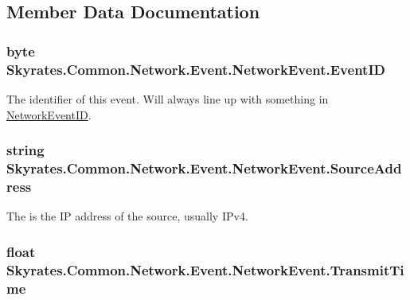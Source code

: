 \subsection{Member Data Documentation}
\hypertarget{class_skyrates_1_1_common_1_1_network_1_1_event_1_1_network_event_ac75427f751e432fb3efe4ac0c2289a5f}{
\subsubsection[{Event\-I\-D}]{\setlength{\rightskip}{0pt plus 5cm}byte Skyrates.\-Common.\-Network.\-Event.\-Network\-Event.\-Event\-I\-D}}\label{class_skyrates_1_1_common_1_1_network_1_1_event_1_1_network_event_ac75427f751e432fb3efe4ac0c2289a5f}


The identifier of this event. Will always line up with something in \hyperlink{namespace_skyrates_1_1_common_1_1_network_a90fc6faa44c44b4284114e861d3e761a}{Network\-Event\-I\-D}. 

\hypertarget{class_skyrates_1_1_common_1_1_network_1_1_event_1_1_network_event_a85fa6ba40f7dfa60824d5c0abc841aab}{
\subsubsection[{Source\-Address}]{\setlength{\rightskip}{0pt plus 5cm}string Skyrates.\-Common.\-Network.\-Event.\-Network\-Event.\-Source\-Address}}\label{class_skyrates_1_1_common_1_1_network_1_1_event_1_1_network_event_a85fa6ba40f7dfa60824d5c0abc841aab}


The is the I\-P address of the source, usually I\-Pv4. 

\hypertarget{class_skyrates_1_1_common_1_1_network_1_1_event_1_1_network_event_abb150b5f12f022b2f2c3ff431179c69d}{
\subsubsection[{Transmit\-Time}]{\setlength{\rightskip}{0pt plus 5cm}float Skyrates.\-Common.\-Network.\-Event.\-Network\-Event.\-Transmit\-Time}}\label{class_skyrates_1_1_common_1_1_network_1_1_event_1_1_network_event_abb150b5f12f022b2f2c3ff431179c69d}


